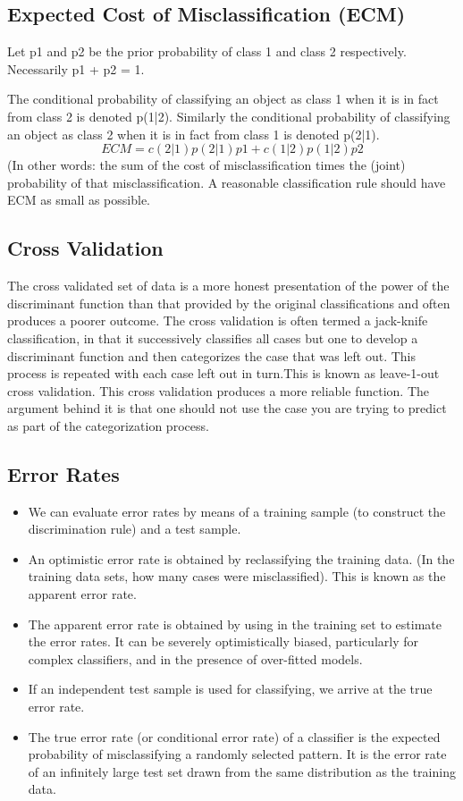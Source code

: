 \documentclass[a4paper,12pt]{article}
\begin{document}
\subsection*{ Expected Cost of Misclassification (ECM)}
Let p1 and p2 be the prior probability of class 1 and class 2 respectively.
Necessarily p1 + p2 = 1.

The conditional probability of classifying an object as class 1 when it is
in fact from class 2 is denoted p(1|2). Similarly the conditional probability
of classifying an object as class 2 when it is in fact from class 1 is denoted
p(2|1).
\[ ECM = c(2|1)p(2|1)p1 + c(1|2)p(1|2)p2\]
(In other words: the sum of the cost of misclassification times the (joint)
probability of that misclassification.
A reasonable classification rule should have ECM as small as possible.
\subsection*{ Cross Validation}


The cross validated set of
data is a more honest presentation of the power of the discriminant function
than that provided by the original classifications and often produces a poorer
outcome. The cross validation is often termed a jack-knife classification, in
that it successively classifies all cases but one to develop a discriminant
function and then categorizes the case that was left out. This process is
repeated with each case left out in turn.This is known as leave-1-out cross
validation.
This cross validation produces a more reliable function. The argument
behind it is that one should not use the case you are trying to predict as part
of the categorization process.
\subsection*{Error Rates}
\begin{itemize}
	\item We can evaluate error rates by means of a training sample (to construct the
	discrimination rule) and a test sample.
	\item An optimistic error rate is obtained by reclassifying the training data. (In
	the training data sets, how many cases were misclassified). This is known
	as the apparent error rate.
	\item The apparent error rate is obtained by using in the training set to estimate
	the error rates. It can be severely optimistically biased, particularly for
	complex classifiers, and in the presence of over-fitted models.
	\item If an independent test sample is used for classifying, we arrive at the true
	error rate.
		\item The true error rate (or conditional error rate) of a classifier is the
	expected probability of misclassifying a randomly selected pattern. It is the
	error rate of an infinitely large test set drawn from the same distribution as
	the training data.
\end{itemize}
\end{document}
